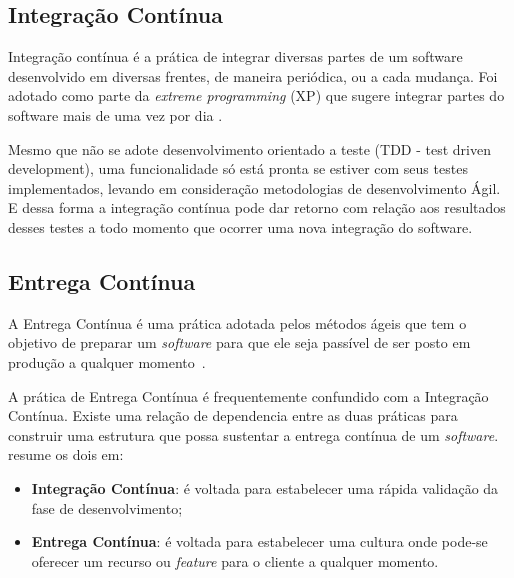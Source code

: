 
\subsection{Integração Contínua}

Integração contínua é a prática de integrar diversas partes de um software
desenvolvido em diversas frentes, de maneira periódica, ou a cada mudança.
Foi adotado como parte da \textit{extreme programming} (XP) que sugere integrar
partes do software mais de uma vez por dia \cite{fowler2006continuous}.

Mesmo que não se adote desenvolvimento orientado a teste (TDD - test driven 
development), uma funcionalidade só está pronta se estiver com seus testes 
implementados, levando em consideração metodologias de desenvolvimento Ágil. 
E dessa forma a integração contínua pode dar retorno com relação aos resultados
desses testes a todo momento que ocorrer uma nova integração do software.

\subsection{Entrega Contínua}

A Entrega Contínua é uma prática adotada pelos métodos ágeis que tem o objetivo
de preparar um \textit{software} para que ele seja passível de ser posto em produção a
qualquer momento~\cite{olausson:2016}. %

A prática de Entrega Contínua  é frequentemente confundido com a Integração
Contínua. Existe uma relação de dependencia entre as duas práticas para
construir uma estrutura que possa sustentar a entrega contínua de um
\textit{software}.~ resume os dois em:

\begin{itemize}
  \item \textbf{Integração Contínua}: é voltada para estabelecer uma rápida
    validação da fase de desenvolvimento;
  \item \textbf{Entrega Contínua}: é voltada para estabelecer uma cultura onde
    pode-se oferecer um recurso ou \textit{feature} para o cliente a qualquer
    momento.
\end{itemize}

